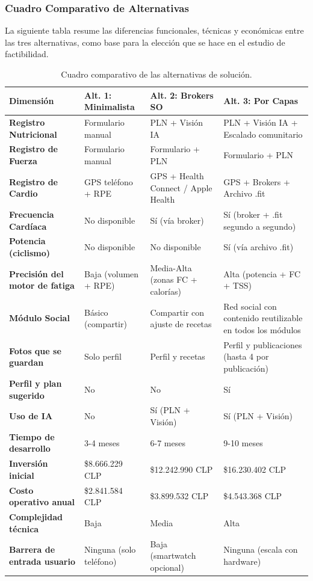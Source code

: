 \subsubsection{Cuadro Comparativo de Alternativas}
La siguiente tabla resume las diferencias funcionales, técnicas y económicas entre las tres alternativas, como base para la elección que se hace en el estudio de factibilidad.

\begin{table}[h!]
    \centering
    \renewcommand{\arraystretch}{1.4}
    \begin{tabular}{|m{3.8cm}|m{3.5cm}|m{3.5cm}|m{3.8cm}|}
        \hline
        \rowcolor[HTML]{EFEFEF}
        \textbf{Dimensión} & \textbf{Alt. 1: Minimalista} & \textbf{Alt. 2: Brokers SO} & \textbf{Alt. 3: Por Capas} \\ \hline
        \textbf{Registro Nutricional} & Formulario manual & PLN + Visión IA & PLN + Visión IA + Escalado comunitario \\ \hline
        \textbf{Registro de Fuerza} & Formulario manual & Formulario + PLN & Formulario + PLN \\ \hline
        \textbf{Registro de Cardio} & GPS teléfono + RPE & GPS + Health Connect / Apple Health & GPS + Brokers + Archivo .fit \\ \hline
        \textbf{Frecuencia Cardíaca} & No disponible & Sí (vía broker) & Sí (broker + .fit segundo a segundo) \\ \hline
        \textbf{Potencia (ciclismo)} & No disponible & No disponible & Sí (vía archivo .fit) \\ \hline
        \textbf{Precisión del motor de fatiga} & Baja (volumen + RPE) & Media-Alta (zonas FC + calorías) & Alta (potencia + FC + TSS) \\ \hline
        \textbf{Módulo Social} & Básico (compartir) & Compartir con ajuste de recetas & Red social con contenido reutilizable en todos los módulos \\ \hline
        \textbf{Fotos que se guardan} & Solo perfil & Perfil y recetas & Perfil y publicaciones (hasta 4 por publicación) \\ \hline
        \textbf{Perfil y plan sugerido} & No & No & Sí \\ \hline
        \textbf{Uso de IA} & No & Sí (PLN + Visión) & Sí (PLN + Visión) \\ \hline
        \textbf{Tiempo de desarrollo} & 3-4 meses & 6-7 meses & 9-10 meses \\ \hline
        \textbf{Inversión inicial} & \$8.666.229 CLP & \$12.242.990 CLP & \$16.230.402 CLP \\ \hline
        \textbf{Costo operativo anual} & \$2.841.584 CLP & \$3.899.532 CLP & \$4.543.368 CLP \\ \hline
        \textbf{Complejidad técnica} & Baja & Media & Alta \\ \hline
        \textbf{Barrera de entrada usuario} & Ninguna (solo teléfono) & Baja (smartwatch opcional) & Ninguna (escala con hardware) \\ \hline
    \end{tabular}
    \caption{Cuadro comparativo de las alternativas de solución.}
    \label{tab:comparativa_alternativas}
\end{table}
